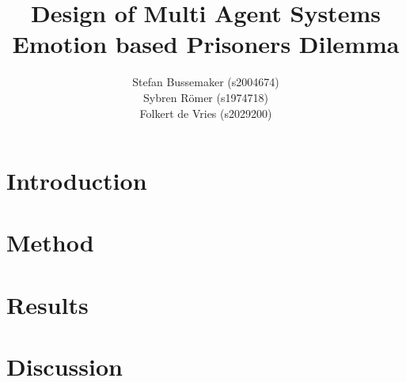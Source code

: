 \documentclass[a4paper]{article}
\title{Design of Multi Agent Systems\\
Emotion based Prisoners Dilemma}
\author{Stefan Bussemaker (s2004674)\\Sybren R\"omer (s1974718)\\Folkert de Vries (s2029200)}
\begin{document}
\maketitle

\section*{Introduction}

\section*{Method}

\section*{Results}

\section*{Discussion}

\printbibliography
\end{document}

